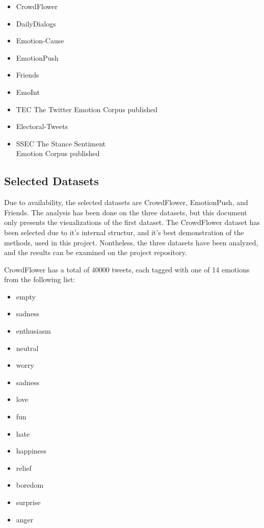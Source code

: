 \begin{itemize}
  \item CrowdFlower %
  \item DailyDialogs~\cite{li2017dailydialog} %
  \item Emotion-Cause~\cite{ghazi2015detecting} %
  \item EmotionPush~\cite{huang2018emotionpush} %
  \item Friends~\cite{chen2018emotionlines} %
  \item EmoInt~\cite{MohammadB17starsem} %
  \item TEC The Twitter Emotion Corpus published~\cite{mohammad2012emotional} %
  \item Electoral-Tweets~\cite{mohammad2014semantic} %
  \item SSEC The Stance Sentiment \\ Emotion Corpus published~\cite{schuff2017annotation} %
\end{itemize}

\subsection{Selected Datasets}\label{sub:Selected Datasets}
Due to availability, the selected datasets are CrowdFlower, EmotionPush, and Friends. The analysis has been done on the three datasets, but this document only presents the visualizations of the first dataset. The CrowdFlower dataset has been selected due to it's internal structur, and it's best demonstration of the methods, used in this project. Nontheless, the three datasets have been analyzed, and the results can be examined on the project repository.

CrowdFlower has a total of 40000 tweets, each tagged with one of 14 emotions from the following list:

\begin{itemize}
  \item empty
  \item sadness
  \item enthusiasm
  \item neutral
  \item worry
  \item sadness
  \item love
  \item fun
  \item hate
  \item happiness
  \item relief
  \item boredom
  \item surprise
  \item anger
\end{itemize}

